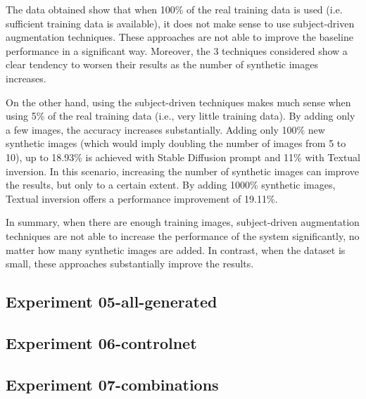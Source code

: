 The data obtained show that when 100\% of the real training data is used (i.e. sufficient training data is available), it does not make sense to use subject-driven augmentation techniques. These approaches are not able to improve the baseline performance in a significant way. Moreover, the 3 techniques considered show a clear tendency to worsen their results as the number of synthetic images increases. 

On the other hand, using the subject-driven techniques makes much sense when using 5\% of the real training data (i.e., very little training data). By adding only a few images, the accuracy increases substantially. Adding only 100\% new synthetic images (which would imply doubling the number of images from 5 to 10), up to 18.93\% is achieved with Stable Diffusion prompt and 11\% with Textual inversion. In this scenario, increasing the number of synthetic images can improve the results, but only to a certain extent. By adding 1000\% synthetic images, Textual inversion offers a performance improvement of 19.11\%.

In summary, when there are enough training images, subject-driven augmentation techniques are not able to increase the performance of the system significantly, no matter how many synthetic images are added. In contrast, when the dataset is small, these approaches substantially improve the results.

\subsection{Experiment 05-all-generated} \label{sec: exp-05}

\subsection{Experiment 06-controlnet} \label{sec: exp-06}


\subsection{Experiment 07-combinations} \label{sec: exp-07}



